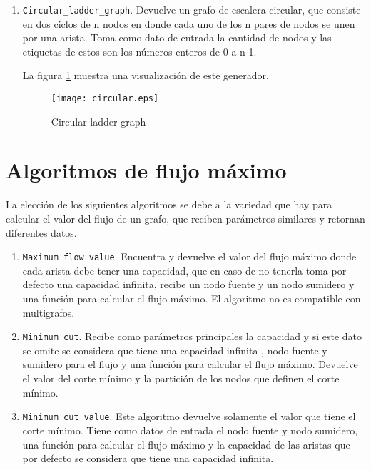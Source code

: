 \documentclass{article}
\begin{document}
\begin{enumerate}
\item \texttt{Circular\_ladder\_graph}. Devuelve un grafo de escalera circular, que consiste en dos ciclos de n nodos en donde cada uno de los n pares de nodos se unen por una arista. Toma como dato de entrada la cantidad de nodos y las etiquetas de estos son los números enteros de 0 a n-1. 

La figura \ref{Figura4} muestra una visualización de este generador. 


\begin{figure}[H]
\centering
\texttt{[image: circular.eps]}  
\caption{Circular ladder graph}
\label{Figura4}
\end{figure}

\end{enumerate}
\section*{Algoritmos de flujo máximo}
La elección de los siguientes algoritmos se debe a la variedad que hay para calcular el valor del flujo de un grafo, que reciben parámetros similares y retornan diferentes datos. 
\begin{enumerate}
\item \texttt{Maximum\_flow\_value}. Encuentra y devuelve el valor del flujo máximo donde cada arista debe tener una capacidad, que en caso de no tenerla toma por defecto una capacidad infinita, recibe un nodo fuente y un nodo sumidero y una función para calcular el flujo máximo.  El algoritmo no es compatible con multigrafos.  


\item \texttt{Minimum\_cut}. Recibe como parámetros principales la capacidad y si este dato se omite se considera que tiene una capacidad infinita , nodo fuente y sumidero para el flujo y una función para calcular el flujo máximo. Devuelve el valor del corte mínimo y la partición de los nodos que definen el corte mínimo.  


\item \texttt{Minimum\_cut\_value}. Este algoritmo devuelve solamente el valor que tiene el corte mínimo. Tiene como datos de entrada el nodo fuente y nodo sumidero, una función para calcular el flujo máximo y la capacidad de las aristas que por defecto se considera que tiene una capacidad infinita. 

\end{enumerate}
\end{document}
